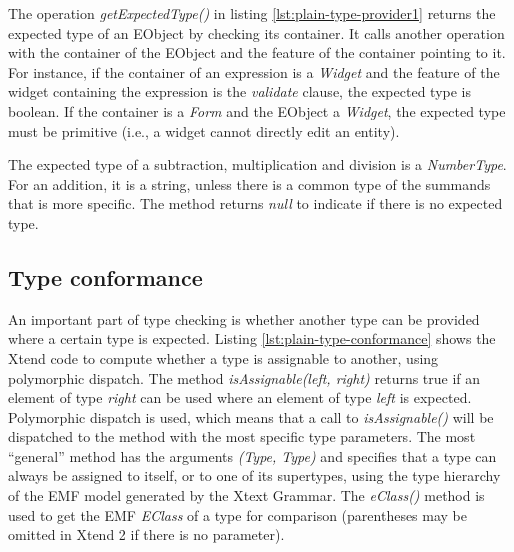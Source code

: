


The operation \emph{getExpectedType()} in listing \ref{lst:plain-type-provider1}
returns the expected type of an EObject by checking its container. It calls
another operation with the container of the EObject and the feature of the
container pointing to it. For instance, if the container of an expression is a
\emph{Widget} and the feature of the widget containing the expression is the
\emph{validate} clause, the expected type is boolean. If the container is a
\emph{Form} and the EObject a \emph{Widget}, the expected type must be primitive
(i.e., a widget cannot directly edit an entity).

The expected type of a subtraction, multiplication and division is a
\emph{NumberType}. For an addition, it is a string, unless there is a common
type of the summands that is more specific. The method returns \emph{null} to
indicate if there is no expected type.

%

\subsection{Type conformance}
An important part of type checking is whether another type can be provided where
a certain type is expected.
Listing \ref{lst:plain-type-conformance} shows the Xtend code to compute whether
a type is assignable to another, using polymorphic dispatch. The method
\emph{isAssignable(left, right)} returns true if an element of
type \emph{right} can be used where an element of type \emph{left} is expected.
Polymorphic dispatch is used, which means that a call to \emph{isAssignable()} will be
dispatched to the method with the most specific type parameters. The most
``general'' method has the arguments \emph{(Type, Type)} and specifies that a type
can always be assigned to itself, or to one of its supertypes, using the type
hierarchy of the EMF model generated by the Xtext Grammar. The \emph{eClass()}
method is used to get the EMF \emph{EClass} of a type for comparison
(parentheses may be omitted in Xtend 2 if there is no parameter).

